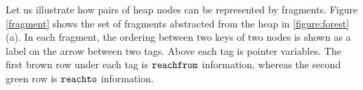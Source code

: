 Let us illustrate how pairs of heap nodes can be represented by fragments. Figure \ref{fragment} shows the set of fragments abstracted from the heap in \ref{figure:forest}(a). In each fragment, the ordering between two keys of two nodes is shown as a label on the arrow between two tags. Above each tag is pointer variables. The first brown row under each tag is $\tt reachfrom$ information, whereas the second green row is $\tt reachto$ information.





